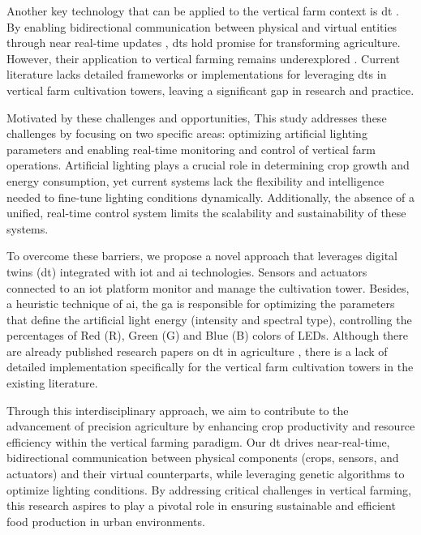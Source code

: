 \documentclass[preprint, review, 12pt]{elsarticle}
\begin{document}
Another key technology that can be applied to the vertical farm context is \gls{dt} \cite{monteiro2023}. By enabling bidirectional communication between physical and virtual entities through near real-time updates \cite{jones2020, singh2021}, \gls{dt}s hold promise for transforming agriculture. However, their application to vertical farming remains underexplored \cite{pylianidis2021a}. Current literature lacks detailed frameworks or implementations for leveraging \gls{dt}s in vertical farm cultivation towers, leaving a significant gap in research and practice.

Motivated by these challenges and opportunities, This study addresses these challenges by focusing on two specific areas: optimizing artificial lighting parameters and enabling real-time monitoring and control of vertical farm operations. Artificial lighting plays a crucial role in determining crop growth and energy consumption, yet current systems lack the flexibility and intelligence needed to fine-tune lighting conditions dynamically. Additionally, the absence of a unified, real-time control system limits the scalability and sustainability of these systems.

To overcome these barriers, we propose a novel approach that leverages digital twins (\gls{dt}) integrated with \gls{iot} and \gls{ai} technologies. Sensors and actuators connected to an \gls{iot} platform monitor and manage the cultivation tower. Besides, a heuristic technique of \gls{ai}, the \gls{ga} is responsible for optimizing the parameters that define the artificial light energy (intensity and spectral type), controlling the percentages of Red (R), Green (G) and Blue (B) colors of LEDs. Although there are already published research papers on \gls{dt} in agriculture \cite{verdouw2017, verdouw2021, pylianidis2021a, nasirahmadi2022, monteiro2023}, there is a lack of detailed implementation specifically for the vertical farm cultivation towers in the existing literature. 

Through this interdisciplinary approach, we aim to contribute to the advancement of precision agriculture by enhancing crop productivity and resource efficiency within the vertical farming paradigm. Our \gls{dt} drives near-real-time, bidirectional communication between physical components (crops, sensors, and actuators) and their virtual counterparts, while leveraging genetic algorithms to optimize lighting conditions. By addressing critical challenges in vertical farming, this research aspires to play a pivotal role in ensuring sustainable and efficient food production in urban environments.
\end{document}
